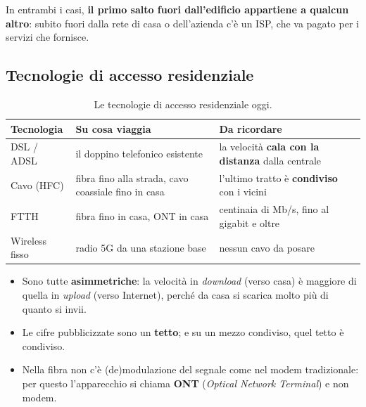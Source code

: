 In entrambi i casi, \textbf{il primo salto fuori dall'edificio appartiene a qualcun altro}: subito
fuori dalla rete di casa o dell'azienda c'è un ISP, che va pagato per i servizi che fornisce.

\subsection{Tecnologie di accesso residenziale}

\begin{table}[H]
\centering
\begin{tabular}{p{2.7cm}p{5cm}p{6.3cm}}
\toprule
\textbf{Tecnologia} & \textbf{Su cosa viaggia} & \textbf{Da ricordare} \\
\midrule
DSL / ADSL & il doppino telefonico esistente & la velocità \textbf{cala con la distanza} dalla centrale \\
Cavo (HFC) & fibra fino alla strada, cavo coassiale fino in casa & l'ultimo tratto è \textbf{condiviso} con i vicini \\
FTTH & fibra fino in casa, ONT in casa & centinaia di Mb/s, fino al gigabit e oltre \\
Wireless fisso & radio 5G da una stazione base & nessun cavo da posare \\
\bottomrule
\end{tabular}
\caption{Le tecnologie di accesso residenziale oggi.}
\end{table}

\begin{itemize}
    \item Sono tutte \textbf{asimmetriche}: la velocità in \emph{download} (verso casa) è maggiore di
          quella in \emph{upload} (verso Internet), perché da casa si scarica molto più di quanto si invii.
    \item Le cifre pubblicizzate sono un \textbf{tetto}; e su un mezzo condiviso, quel tetto è condiviso.
    \item Nella fibra non c'è (de)modulazione del segnale come nel modem tradizionale: per questo
          l'apparecchio si chiama \textbf{ONT} (\emph{Optical Network Terminal}) e non modem.
\end{itemize}


